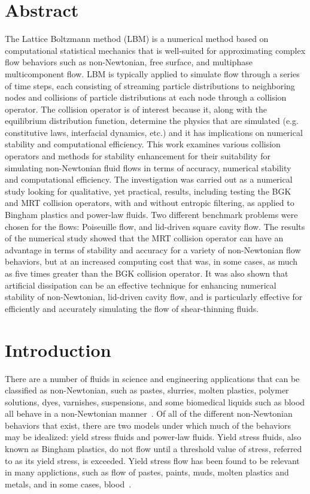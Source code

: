 \section*{Abstract}

The Lattice Boltzmann method (LBM) is a numerical method based on computational statistical mechanics that is well-suited for approximating complex flow behaviors such as non-Newtonian, free surface, and multiphase multicomponent flow.
LBM is typically applied to simulate flow through a series of time steps, each consisting of streaming particle distributions to neighboring nodes and collisions of particle distributions at each node through a collision operator.
The collision operator is of interest because it, along with the equilibrium distribution function, determine the physics that are simulated (e.g. constitutive laws, interfacial dynamics, etc.) and it has implications on numerical stability and computational efficiency.
This work examines various collision operators and methods for stability enhancement for their suitability for simulating non-Newtonian fluid flows in terms of accuracy, numerical stability and computational efficiency.
The investigation was carried out as a numerical study looking for qualitative, yet practical, results, including testing the BGK and MRT collision operators, with and without entropic filtering, as applied to Bingham plastics and power-law fluids.
Two different benchmark problems were chosen for the flows: Poiseuille flow, and lid-driven square cavity flow.
The results of the numerical study showed that the MRT collision operator can have an advantage in terms of stability and accuracy for a variety of non-Newtonian flow behaviors, but at an increased computing cost that was, in some cases, as much as five times greater than the BGK collision operator.
It was also shown that artificial dissipation can be an effective technique for enhancing numerical stability of non-Newtonian, lid-driven cavity flow, and is particularly effective for efficiently and accurately simulating the flow of shear-thinning fluids.

\section{Introduction}

There are a number of fluids in science and engineering applications that can be classified as non-Newtonian, such as pastes, slurries, molten plastics, polymer solutions, dyes, varnishes, suspensions, and some biomedical liquids such as blood all behave in a non-Newtonian manner~\cite{bohme1987non}.
Of all of the different non-Newtonian behaviors that exist, there are two models under which much of the behaviors may be idealized: yield stress fluids and power-law fluids.
Yield stress fluids, also known as Bingham plastics, do not flow until a threshold value of stress, referred to as its yield stress, is exceeded.
Yield stress flow has been found to be relevant in many applictions, such as flow of pastes, paints, muds, molten plastics and metals, and in some cases, blood~\cite{wang2011lattice}.


